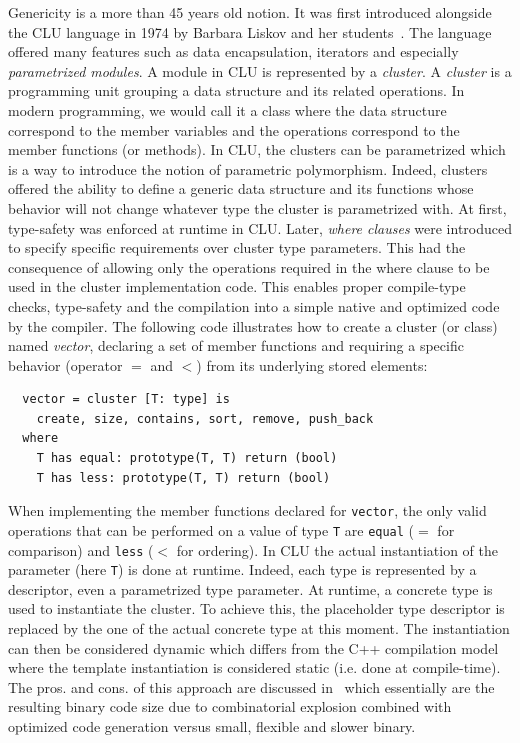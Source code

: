 Genericity is a more than 45 years old notion. It was first introduced alongside the CLU language in 1974 by Barbara
Liskov and her students~\parencite{liskov.1993.cluart}. The language offered many features such as data encapsulation,
iterators and especially \emph{parametrized modules}. A module in CLU is represented by a \emph{cluster}. A
\emph{cluster} is a programming unit grouping a data structure and its related operations. In modern programming, we
would call it a class where the data structure correspond to the member variables and the operations correspond to the
member functions (or methods). In CLU, the clusters can be parametrized which is a way to introduce the notion of
parametric polymorphism. Indeed, clusters offered the ability to define a generic data structure and its functions whose
behavior will not change whatever type the cluster is parametrized with. At first, type-safety was enforced at runtime
in CLU. Later, \emph{where clauses} were introduced to specify specific requirements over cluster type parameters. This
had the consequence of allowing only the operations required in the where clause to be used in the cluster
implementation code. This enables proper compile-type checks, type-safety and the compilation into a simple native and
optimized code by the compiler. The following code illustrates how to create a cluster (or class) named \emph{vector},
declaring a set of member functions and requiring a specific behavior (operator \(=\) and \(<\)) from its underlying
stored elements:

\begin{verbatim}
  vector = cluster [T: type] is
    create, size, contains, sort, remove, push_back
  where
    T has equal: prototype(T, T) return (bool)
    T has less: prototype(T, T) return (bool)
\end{verbatim}

When implementing the member functions declared for \texttt{vector}, the only valid operations that can be performed on
a value of type \texttt{T} are \texttt{equal} (\(=\) for comparison) and \texttt{less} (\(<\) for ordering). In CLU the
actual instantiation of the parameter (here \texttt{T}) is done at runtime. Indeed, each type is represented by a
descriptor, even a parametrized type parameter. At runtime, a concrete type is used to instantiate the cluster. To
achieve this, the placeholder type descriptor is replaced by the one of the actual concrete type at this moment. The
instantiation can then be considered dynamic which differs from the C++ compilation model where the template
instantiation is considered static (i.e. done at compile-time). The pros. and cons. of this approach are discussed
in~\parencite{atkinson.1978.cluimpl} which essentially are the resulting binary code size due to combinatorial explosion
combined with optimized code generation versus small, flexible and slower binary.

